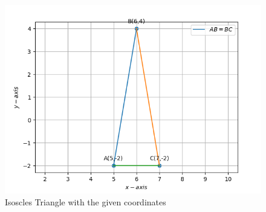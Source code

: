 \documentclass[12pt]{article}
\begin{document}
\begin{enumerate}
\begin{figure}[!h]
\begin{center}
	    \includegraphics[width=\columnwidth]{figs/Vector2.png}
	\end{center}
\caption{Isoscles Triangle with the given coordinates}
\label{fig:Fig}
\end{figure}
\end{enumerate}
\end{document}
